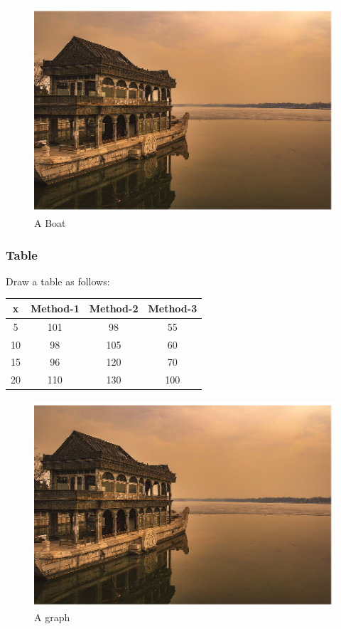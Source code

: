 \documentclass[conference]{IEEEtran}
\begin{document}
\begin{figure}[h!]
	\includegraphics[width=\linewidth]{boat.jpg}
	\caption{A Boat}
	\label{fig:boat}
\end{figure}

\subsubsection{Table}
Draw a table as follows:
\begin{table}[h]
	\begin{center}
		\begin{tabular}{|c|c|c|c|}
			
			x & Method-1 & Method-2 & Method-3\\
			\hline
			5 & 101 & 98 & 55\\
			\hline
			10 & 98 & 105 & 60\\
			\hline
			15 & 96 & 120 & 70\\
			\hline
			20 & 110 & 130 & 100\\
			\hline
		\end{tabular}
	\end{center}
\end{table}


\begin{figure}[h!]
	\includegraphics[width=\linewidth]{boat.jpg}
	\caption{A graph}
	\label{fig:boat}
\end{figure}
\end{document}
